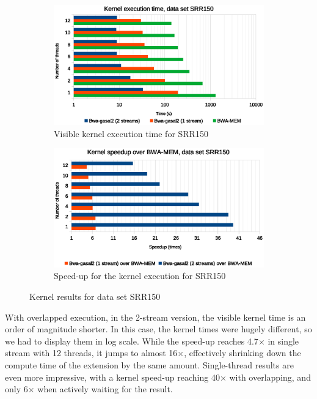 \begin{figure}[p]
	\centering
	\begin{subfigure}[t]{1\textwidth}
		\centering
		\includegraphics[width=1\textwidth]{srr150/kernel-exec-time-srr150}
		\caption{Visible kernel execution time for SRR150}
		\label{fig:kernel-exec-time-srr150}
	\end{subfigure}%
	
	\begin{subfigure}[b]{1\textwidth}
		\centering
		\includegraphics[width=1\textwidth]{srr150/kernel-exec-speed-up-srr150}
		\caption{Speed-up for the kernel execution for SRR150}
		\label{fig:kernel-exec-speed-up-srr150}
	\end{subfigure}
	\caption{Kernel results for data set SRR150}
\end{figure}

With overlapped execution, in the 2-stream version, the visible kernel time is an order of magnitude shorter. In this case, the kernel times were hugely different, so we had to display them in log scale. While the speed-up reaches 4.7$\times$ in single stream with 12 threads, it jumps to almost 16$\times$, effectively shrinking down the compute time of the extension by the same amount. Single-thread results are even more impressive, with a  kernel speed-up reaching 40$\times$ with overlapping, and only 6$\times$ when actively waiting for the result.


